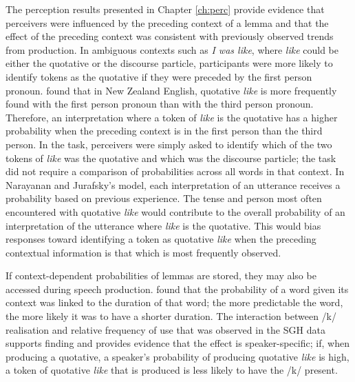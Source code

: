 The perception results presented in Chapter \ref{ch:perc} provide evidence that perceivers were influenced by the preceding context of a lemma and that the effect of the preceding context was consistent with previously observed trends from production.  In ambiguous contexts such as \textit{I was like}, where \textit{like} could be either the quotative or the discourse particle, participants were more likely to identify tokens as the quotative if they were preceded by the first person pronoun.  \citet{buchstallerdarcy2009} found that in New Zealand English, quotative \textit{like} is more frequently found with the first person pronoun than with the third person pronoun.  Therefore, an interpretation where a token of \textit{like} is the quotative has a higher probability when the preceding context is in the first person than the third person.  In the task, perceivers were simply asked to identify which of the two tokens of \textit{like} was the quotative and which was the discourse particle; the task did not require a comparison of probabilities across all words in that context.  In Narayanan and Jurafsky's model, each interpretation of an utterance receives a probability based on previous experience.  The tense and person most often encountered with quotative \textit{like} would contribute to the overall probability of an interpretation of the utterance where \textit{like} is the quotative.  This would bias responses toward identifying a token as quotative \textit{like} when the preceding contextual information is that which is most frequently observed.

If context-dependent probabilities of lemmas are stored, they may also be accessed during speech production.  \citet{jurafskyetal2002} found that the probability of a word given its context was linked to the duration of that word; the more predictable the word, the more likely it was to have a shorter duration.  The interaction between /k/ realisation and relative frequency of use that was observed in the SGH data supports  finding and provides evidence that the effect is speaker-specific; if, when producing a quotative, a speaker's probability of producing quotative \textit{like} is high, a token of quotative \textit{like} that is produced is less likely to have the /k/ present.  




